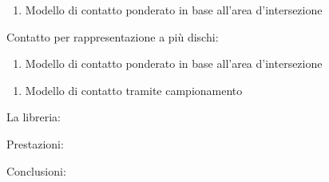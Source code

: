 \documentclass[xcolor=dvipsnames]{beamer} %
\begin{document}
\begin{frame}
	\begin{enumerate}\addtocounter{enumi}{1}
		\item Modello di contatto ponderato in base all'area d'intersezione
	\end{enumerate}
\end{frame}

\begin{frame}
	\Large{Contatto per rappresentazione a più dischi}:
	\normalsize
	\begin{enumerate}
		\item Modello di contatto ponderato in base all'area d'intersezione
	\end{enumerate}
\end{frame}

\begin{frame}
	\begin{enumerate}\addtocounter{enumi}{1}
		\item Modello di contatto tramite campionamento
	\end{enumerate}
\end{frame}

\begin{frame}
	\Large {La libreria}:
	
\end{frame}

\begin{frame}
	\Large {Prestazioni}:

\end{frame}

\begin{frame}
	\Large {Conclusioni}:
	
\end{frame}
\end{document}
